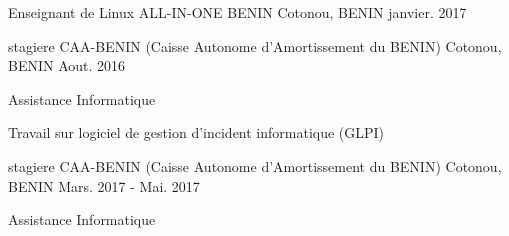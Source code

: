 \begin{cventries}


\cventry
{Enseignant de Linux} %
{ALL-IN-ONE BENIN} %
{Cotonou, BENIN} %
{janvier.  2017} %
{ %
}


\cventry
{stagiere} %
{CAA-BENIN (Caisse Autonome d'Amortissement du BENIN) } %
{Cotonou, BENIN} %
{Aout. 2016} %
{ %
\begin{cvitems}
\item {Assistance Informatique}
\item {Travail sur logiciel de gestion d'incident informatique (GLPI)}
\end{cvitems}
}


\cventry
{stagiere} %
{CAA-BENIN (Caisse Autonome d'Amortissement du BENIN) } %
{Cotonou, BENIN} %
{Mars. 2017 - Mai. 2017} %
{ %
\begin{cvitems}
\item {Assistance Informatique}
\end{cvitems}
}



\end{cventries}